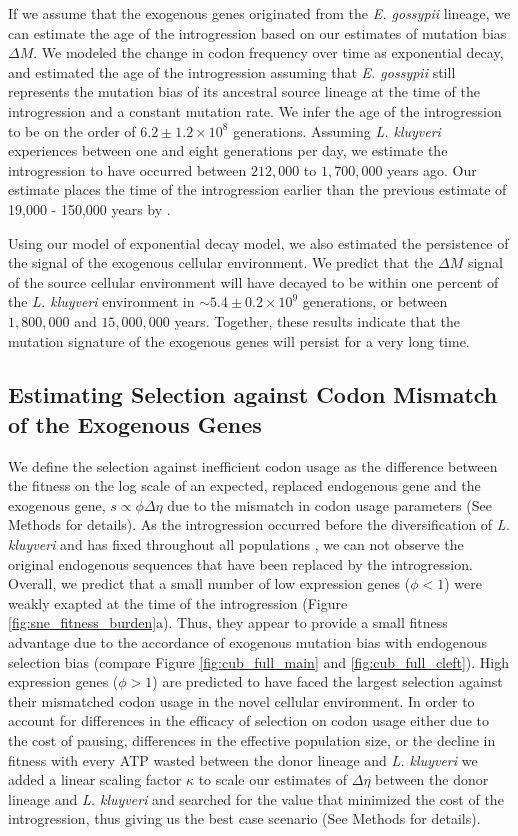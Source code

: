 \documentclass[doublespacing,linenumbers]{bmcart-modified}
\newcommand{\kluyveri}{\textit{L. kluyveri}\xspace}
\newcommand{\gossypii}{\textit{E. gossypii}\xspace}
\newcommand{\DM}{\ensuremath{{\Delta M}}\xspace}
\newcommand{\DE}{\ensuremath{{\Delta \eta}}\xspace}
\begin{document}
If we assume that the exogenous genes originated from the \gossypii lineage, we can estimate the age of the introgression based on our estimates of mutation bias \DM.
We modeled the change in codon frequency over time as exponential decay, and estimated the age of the introgression assuming that \gossypii still represents the mutation bias of its ancestral source lineage at the time of the introgression and a constant mutation rate.
We infer the age of the introgression to be on the order of $6.2\pm1.2\times 10^8$ generations. 
Assuming \kluyveri experiences between one and eight generations per day, we estimate the introgression to have occurred between $212,000$ to $1,700,000$ years ago.
Our estimate places the time of the introgression earlier than the previous estimate of 19,000 - 150,000 years by \cite{friedrich2015}.

Using our model of exponential decay model, we also estimated the persistence of the signal of the exogenous cellular environment.
We predict that the \DM signal of the source cellular environment will have decayed to be within one percent of the \kluyveri environment in $\sim 5.4\pm0.2\times 10^9 $ generations, or between $1,800,000$ and $15,000,000$ years.
Together, these results indicate that the mutation signature of the exogenous genes will persist for a very long time.

\subsection*{Estimating Selection against Codon Mismatch of the Exogenous Genes}

We define the selection against inefficient codon usage as the difference between the fitness on the log scale of an expected, replaced endogenous gene and the exogenous gene, $s \propto \phi \DE$ due to the mismatch in codon usage parameters (See Methods for details).
As the introgression occurred before the diversification of \kluyveri and has fixed throughout all populations \citep{friedrich2015}, we can not observe the original endogenous sequences that have been replaced by the introgression.
Overall, we predict that a small number of low expression genes ($\phi < 1$) were weakly exapted at the time of the introgression (Figure \ref{fig:sne_fitness_burden}a).
Thus, they appear to provide a small fitness advantage due to the accordance of exogenous mutation bias with endogenous selection bias (compare Figure \ref{fig:cub_full_main} and \ref{fig:cub_full_cleft}).
High expression genes ($\phi > 1$) are predicted to have faced the largest selection against their mismatched codon usage in the novel cellular environment.
In order to account for differences in the efficacy of selection on codon usage either due to the cost of pausing, differences in the effective population size, or the decline in fitness with every ATP wasted between the donor lineage and \kluyveri we added a linear scaling factor $\kappa$ to scale our estimates of \DE between the donor lineage and \kluyveri and searched for the value that minimized the cost of the introgression, thus giving us the best case scenario (See Methods for details).
\end{document}
